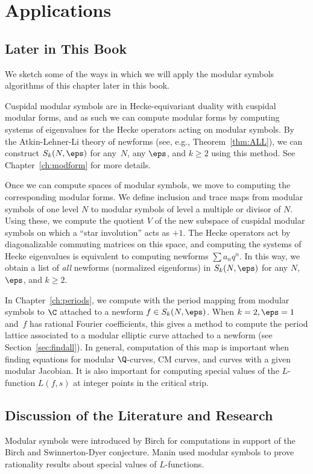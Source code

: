    



\section{Applications}
\subsection{Later in This Book}
We sketch some of the ways in which we will apply the
modular symbols algorithms of this chapter later in this book.

Cuspidal modular symbols are in Hecke-equivariant duality with
cuspidal modular forms, and as such we can compute modular forms by
computing systems of eigenvalues for the Hecke operators acting on
modular symbols.  By the Atkin-Lehner-Li theory of newforms (see,
e.g., Theorem~\ref{thm:ALL}), we can construct $S_k(N,\eps)$ for
any~$N$, any $\eps$, and $k\geq 2$ using this method.  See
Chapter~\ref{ch:modform} for more details.

Once we can compute spaces of modular symbols, we move to computing
the corresponding modular forms.  We
define inclusion and trace maps from modular symbols of one level $N$
to modular symbols of level a multiple or divisor of $N$.  Using these,
we compute the quotient $V$ of the new subspace of cuspidal modular
symbols on which a ``star involution'' acts as $+1$.  The Hecke
operators act by diagonalizable commuting matrices on this space, and
computing the systems of Hecke eigenvalues is equivalent
to computing newforms $\sum a_n q^n$.  In this way, we
obtain a list of {\em all} newforms (normalized eigenforms) in
$S_k(N,\eps)$ for any $N$, $\eps$, and $k\geq 2$.

In Chapter~\ref{ch:periods}, we compute with the period mapping from
modular symbols to $\C$ attached to a newform $f \in S_k(N,\eps)$.
When $k=2, \eps=1$ and~$f$ has rational Fourier coefficients, this
gives a method to compute the period lattice associated to a modular
elliptic curve attached to a newform (see
Section~\ref{sec:findall}).  In general, computation of this map
is important when finding equations for modular $\Q$-curves, CM
curves, and curves with a given modular Jacobian.  It is also
important for computing special values of the $L$-function $L(f,s)$ at
integer points in the critical strip.

\subsection{Discussion of the Literature and Research}
Modular symbols were introduced by Birch \cite{birch:bsd} for
computations in support of the Birch and Swinnerton-Dyer conjecture.
Manin \cite{manin:parabolic} used modular symbols to
prove rationality results about special values of $L$-functions.

